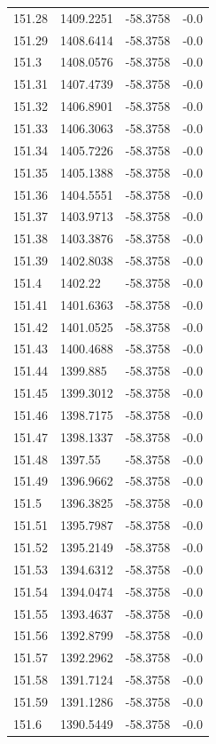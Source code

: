 \begin{table}[H]
\begin{tabular}{llll}
151.28 & 1409.2251 & -58.3758 & -0.0 \\
151.29 & 1408.6414 & -58.3758 & -0.0 \\
151.3 & 1408.0576 & -58.3758 & -0.0 \\
151.31 & 1407.4739 & -58.3758 & -0.0 \\
151.32 & 1406.8901 & -58.3758 & -0.0 \\
151.33 & 1406.3063 & -58.3758 & -0.0 \\
151.34 & 1405.7226 & -58.3758 & -0.0 \\
151.35 & 1405.1388 & -58.3758 & -0.0 \\
151.36 & 1404.5551 & -58.3758 & -0.0 \\
151.37 & 1403.9713 & -58.3758 & -0.0 \\
151.38 & 1403.3876 & -58.3758 & -0.0 \\
151.39 & 1402.8038 & -58.3758 & -0.0 \\
151.4 & 1402.22 & -58.3758 & -0.0 \\
151.41 & 1401.6363 & -58.3758 & -0.0 \\
151.42 & 1401.0525 & -58.3758 & -0.0 \\
151.43 & 1400.4688 & -58.3758 & -0.0 \\
151.44 & 1399.885 & -58.3758 & -0.0 \\
151.45 & 1399.3012 & -58.3758 & -0.0 \\
151.46 & 1398.7175 & -58.3758 & -0.0 \\
151.47 & 1398.1337 & -58.3758 & -0.0 \\
151.48 & 1397.55 & -58.3758 & -0.0 \\
151.49 & 1396.9662 & -58.3758 & -0.0 \\
151.5 & 1396.3825 & -58.3758 & -0.0 \\
151.51 & 1395.7987 & -58.3758 & -0.0 \\
151.52 & 1395.2149 & -58.3758 & -0.0 \\
151.53 & 1394.6312 & -58.3758 & -0.0 \\
151.54 & 1394.0474 & -58.3758 & -0.0 \\
151.55 & 1393.4637 & -58.3758 & -0.0 \\
151.56 & 1392.8799 & -58.3758 & -0.0 \\
151.57 & 1392.2962 & -58.3758 & -0.0 \\
151.58 & 1391.7124 & -58.3758 & -0.0 \\
151.59 & 1391.1286 & -58.3758 & -0.0 \\
151.6 & 1390.5449 & -58.3758 & -0.0 \\

\end{tabular}
\end{table}
